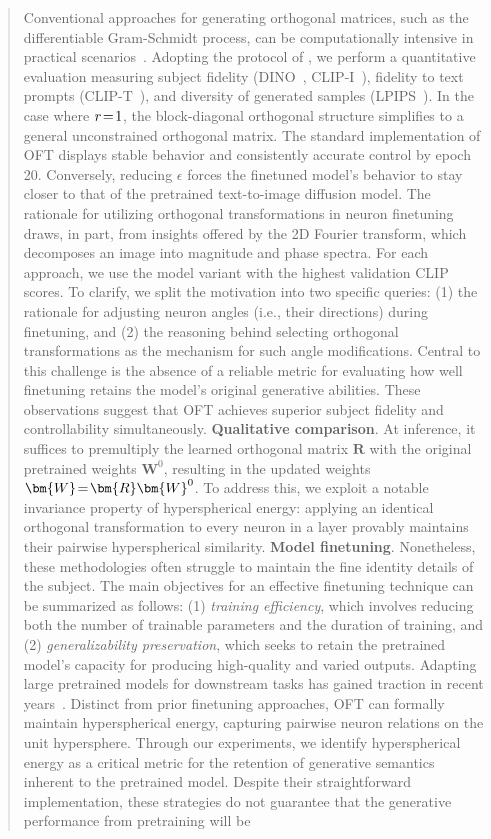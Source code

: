 \begin{itemize}[leftmargin=*,nosep]
\begin{abstract}
Conventional approaches for generating orthogonal matrices, such as the differentiable Gram-Schmidt process, can be computationally intensive in practical scenarios~\cite{liu2021orthogonal}. Adopting the protocol of \cite{ruiz2023dreambooth}, we perform a quantitative evaluation measuring subject fidelity (DINO~\cite{caron2021emerging}, CLIP-I~\cite{radford2021learning}), fidelity to text prompts (CLIP-T~\cite{radford2021learning}), and diversity of generated samples (LPIPS~\cite{zhang2018unreasonable}). In the case where $\thickmuskip=2mu \medmuskip=2mu r=1$, the block-diagonal orthogonal structure simplifies to a general unconstrained orthogonal matrix. The standard implementation of OFT displays stable behavior and consistently accurate control by epoch 20. Conversely, reducing $\epsilon$ forces the finetuned model’s behavior to stay closer to that of the pretrained text-to-image diffusion model. The rationale for utilizing orthogonal transformations in neuron finetuning draws, in part, from insights offered by the 2D Fourier transform, which decomposes an image into magnitude and phase spectra. For each approach, we use the model variant with the highest validation CLIP scores. To clarify, we split the motivation into two specific queries: (1) the rationale for adjusting neuron angles (i.e., their directions) during finetuning, and (2) the reasoning behind selecting orthogonal transformations as the mechanism for such angle modifications. Central to this challenge is the absence of a reliable metric for evaluating how well finetuning retains the model's original generative abilities. These observations suggest that OFT achieves superior subject fidelity and controllability simultaneously. \textbf{Qualitative comparison}. At inference, it suffices to premultiply the learned orthogonal matrix $\bm{R}$ with the original pretrained weights $\bm{W}^0$, resulting in the updated weights $\thickmuskip=2mu \medmuskip=2mu \bm{W}=\bm{R}\bm{W}^0$. To address this, we exploit a notable invariance property of hyperspherical energy: applying an identical orthogonal transformation to every neuron in a layer provably maintains their pairwise hyperspherical similarity. \textbf{Model finetuning}. Nonetheless, these methodologies often struggle to maintain the fine identity details of the subject. The main objectives for an effective finetuning technique can be summarized as follows: (1) \emph{training efficiency}, which involves reducing both the number of trainable parameters and the duration of training, and (2) \emph{generalizability preservation}, which seeks to retain the pretrained model’s capacity for producing high-quality and varied outputs. Adapting large pretrained models for downstream tasks has gained traction in recent years~\cite{devlin2018bert,brown2020language,he2022masked}. Distinct from prior finetuning approaches, OFT can formally maintain hyperspherical energy, capturing pairwise neuron relations on the unit hypersphere. Through our experiments, we identify hyperspherical energy as a critical metric for the retention of generative semantics inherent to the pretrained model. Despite their straightforward implementation, these strategies do not guarantee that the generative performance from pretraining will be 
\end{abstract}
\end{itemize}
